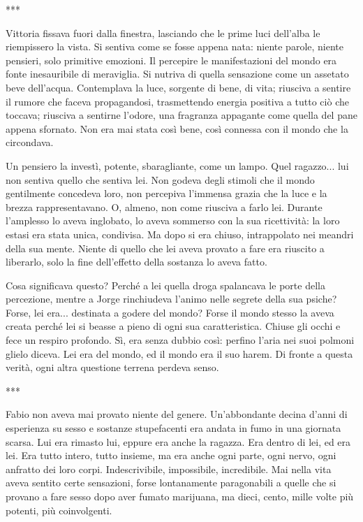 ***

Vittoria fissava fuori dalla finestra, lasciando che le prime luci dell'alba le riempissero la vista. Si sentiva come se fosse appena nata: niente parole, niente pensieri, solo primitive emozioni. Il percepire le manifestazioni del mondo era fonte inesauribile di meraviglia. Si nutriva di quella sensazione come un assetato beve dell'acqua. Contemplava la luce, sorgente di bene, di vita; riusciva a sentire il rumore che faceva propagandosi, trasmettendo energia positiva a tutto ciò che toccava; riusciva a sentirne l'odore, una fragranza appagante come quella del pane appena sfornato. Non era mai stata così bene, così connessa con il mondo che la circondava.

Un pensiero la investì, potente, sbaragliante, come un lampo. Quel ragazzo... lui non sentiva quello che sentiva lei. Non godeva degli stimoli che il mondo gentilmente concedeva loro, non percepiva l'immensa grazia che la luce e la brezza rappresentavano. O, almeno, non come riusciva a farlo lei. Durante l'amplesso lo aveva inglobato, lo aveva sommerso con la sua ricettività: la loro estasi era stata unica, condivisa. Ma dopo si era chiuso, intrappolato nei meandri della sua mente. Niente di quello che lei aveva provato a fare era riuscito a liberarlo, solo la fine dell'effetto della sostanza lo aveva fatto.

Cosa significava questo? Perché a lei quella droga spalancava le porte della percezione, mentre a Jorge rinchiudeva l'animo nelle segrete della sua psiche? Forse, lei era... destinata a godere del mondo? Forse il mondo stesso la aveva creata perché lei si beasse a pieno di ogni sua caratteristica. Chiuse gli occhi e fece un respiro profondo. Sì, era senza dubbio così: perfino l'aria nei suoi polmoni glielo diceva. Lei era del mondo, ed il mondo era il suo harem. Di fronte a questa verità, ogni altra questione terrena perdeva senso.

***

Fabio non aveva mai provato niente del genere. Un'abbondante decina d'anni di esperienza su sesso e sostanze stupefacenti era andata in fumo in una giornata scarsa. Lui era rimasto lui, eppure era anche la ragazza. Era dentro di lei, ed era lei. Era tutto intero, tutto insieme, ma era anche ogni parte, ogni nervo, ogni anfratto dei loro corpi. Indescrivibile, impossibile, incredibile. Mai nella vita aveva sentito certe sensazioni, forse lontanamente paragonabili a quelle che si provano a fare sesso dopo aver fumato marijuana, ma dieci, cento, mille volte più potenti, più coinvolgenti.

